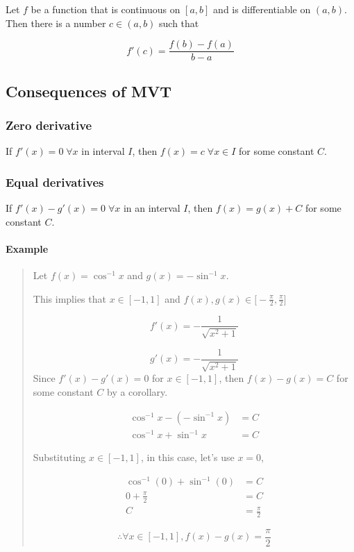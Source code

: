 \documentclass[
]{article}
\begin{document}
Let \(f\) be a function that is continuous on \([a,b]\) and is
differentiable on \((a,b)\). Then there is a number \(c\in(a,b)\) such
that

\[ f'(c)=\frac{f(b)-f(a)}{b-a} \]

\hypertarget{consequences-of-mvt}{%
\subsection{Consequences of MVT}\label{consequences-of-mvt}}

\hypertarget{zero-derivative}{%
\subsubsection{Zero derivative}\label{zero-derivative}}

If \(f'(x)=0 \;\forall x\) in interval \(I\), then
\(f(x)=c \;\forall x\in I\) for some constant \(C\).

\hypertarget{equal-derivatives}{%
\subsubsection{Equal derivatives}\label{equal-derivatives}}

If \(f'(x)-g'(x)=0 \;\forall x\) in an interval \(I\), then
\(f(x)=g(x)+C\) for some constant \(C\).

\hypertarget{example}{%
\paragraph*{Example}\label{example}}

\begin{quote}
Let \(f(x)=\cos^{-1}x\) and \(g(x)=-\sin^{-1}x\).

This implies that \(x \in [-1,1]\) and
\(\displaystyle f(x),g(x) \in \Big[-\frac{\pi}{2},\frac{\pi}{2}\Big]\)

\[ f'(x)=-\frac{1}{\sqrt{x^2+1}}\]

\[ g'(x)=-\frac{1}{\sqrt{x^2+1}} \] Since \(f'(x)-g'(x)=0\) for
\(x \in [-1,1]\), then \(f(x)-g(x)=C\) for some constant \(C\) by a
corollary.

\begin{align*}
\cos^{-1}x - (-\sin^{-1}x)&=C \\
\cos^{-1}x +\sin^{-1}x&=C
\end{align*}

Substituting \(x \in [-1,1]\), in this case, let's use \(x=0\),

\begin{align*}
\cos^{-1}(0) +\sin^{-1}(0)&=C \\
0 + \frac{\pi}{2} &= C \\
C &= \frac{\pi}{2} 
\end{align*}

\[ \therefore \forall x \in[-1,1],f(x)-g(x)= \frac{\pi}{2}\]
\end{quote}
\end{document}
